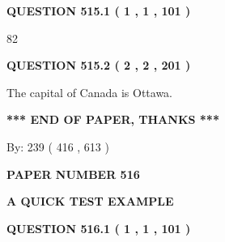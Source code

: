\documentclass[12pt]{article}
\begin{document}
{\textbf{\Large{QUESTION
515.1 
 ( 1 , 1 , 101 )
}}}
  
  
 
 
\noindent{}

82
 
 
  
\vspace{0.2in}
  
{\textbf{\Large{QUESTION
515.2 
 ( 2 , 2 , 201 )
}}}
  
  
 
 
\noindent{}
 
 
The capital of Canada is Ottawa.
 
 
 
 
   
   
 \vspace{0.2in}
 
   
   
   
   
\vspace{1.0in} 
{\textbf{\large{ *** END OF PAPER, THANKS *** }}} 
   
   
\hspace{1.0in} By: 
 239 ( 416 ,  613 )
   
   
   
   
\newpage 
\setcounter{page}{ 
   516001 } 
   
   
   
   
 {\textbf{ \Large{ PAPER NUMBER  516  }}}
   
   
\vspace{0.2in}
   
   
   
   
   
   
 \vspace{0.2in}
{\LARGE {\textbf{ A QUICK TEST EXAMPLE}}}
   
   
  
\vspace{0.2in}
  
{\textbf{\Large{QUESTION
516.1 
 ( 1 , 1 , 101 )
}}}
  
  
 
 
\noindent{}
\end{document}
